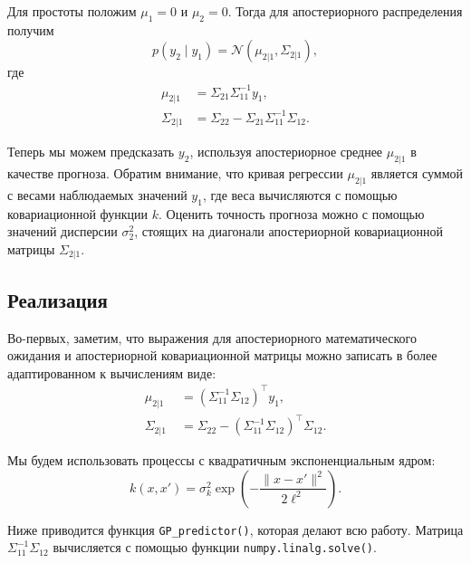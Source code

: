 \documentclass[11pt,a4paper]{article}
\begin{document}
    Для простоты положим \(\mu_{1} = 0\) и \(\mu_{2} = 0\). Тогда для
апостериорного распределения получим \[
  p(y_2 \mid y_1) = \mathcal{N}(\mu_{2|1}, \Sigma_{2|1}),
\]
где \[
\begin{split}
    \mu_{2|1}    &= \Sigma_{21} \Sigma_{11}^{-1} y_1, \\
    \Sigma_{2|1} &= \Sigma_{22} - \Sigma_{21} \Sigma_{11}^{-1}\Sigma_{12}.
\end{split}
\]

Теперь мы можем предсказать \(y_2\), используя апостериорное среднее
\(\mu_{2|1}\) в качестве прогноза. Обратим внимание, что кривая
регрессии \(\mu_{2|1}\) является суммой с весами наблюдаемых значений
\(y_1\), где веса вычисляются с помощью ковариационной функции \(k\).
Оценить точность прогноза можно с помощью значений дисперсии
\(\sigma_2^2\), стоящих на диагонали апостериорной ковариационной
матрицы \(\Sigma_{2|1}\).

    \hypertarget{ux440ux435ux430ux43bux438ux437ux430ux446ux438ux44f}{%
\subsection{Реализация}\label{ux440ux435ux430ux43bux438ux437ux430ux446ux438ux44f}}

Во-первых, заметим, что выражения для апостериорного математического
ожидания и апостериорной ковариационной матрицы можно записать в более
адаптированном к вычислениям виде: \[
\begin{split}
    \mu_{2|1}    &\;= (\Sigma_{11}^{-1}\Sigma_{12})^\top  y_1, \\
    \Sigma_{2|1} &\;= \Sigma_{22} - (\Sigma_{11}^{-1}\Sigma_{12})^\top  \Sigma_{12}.
\end{split}
\]

    Мы будем использовать процессы с квадратичным экспоненциальным ядром: \[
  k(x, x') = \sigma_k^2 \exp{ \left( -\frac{\lVert x - x' \rVert^2}{2\ell^2}  \right) }.
\]

Ниже приводится функция \texttt{GP\_predictor()}, которая делают всю
работу. Матрица \(\Sigma_{11}^{-1}\Sigma_{12}\) вычисляется с помощью
функции \texttt{numpy.linalg.solve()}.
\end{document}
